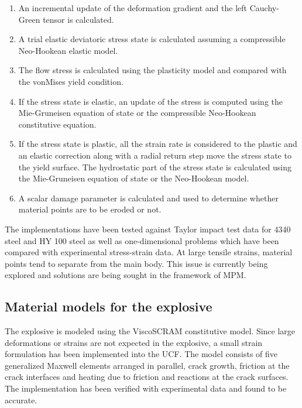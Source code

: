 \begin{itemize}
\begin{enumerate}
        \item An incremental update of the deformation gradient and
              the left Cauchy-Green tensor is calculated.
        \item A trial elastic deviatoric stress state is calculated
              assuming a compressible Neo-Hookean elastic model.
        \item The flow stress is calculated using the plasticity
              model and compared with the vonMises yield condition.
        \item If the stress state is elastic, an update of the 
              stress is computed using the Mie-Gruneisen equation
              of state or the compressible Neo-Hookean constitutive
              equation.
        \item If the stress state is plastic, all the strain rate 
              is considered to the plastic and an elastic correction
              along with a radial return step move the stress state
              to the yield surface.  The hydrostatic part of the 
              stress state is calculated using the Mie-Gruneisen
              equation of state or the Neo-Hookean model.
        \item A scalar damage parameter is calculated and used
              to determine whether material points are to be eroded
              or not.
     \end{enumerate}
\end{itemize}

The implementations have been tested against Taylor impact test data
for 4340 steel and HY 100 steel as well as one-dimensional problems
which have been compared with experimental stress-strain data.  At 
large tensile strains, material points tend to separate from the 
main body.  This issue is currently being explored and solutions are
being sought in the framework of MPM.

\subsection{Material models for the explosive}
The explosive is modeled using the ViscoSCRAM constitutive 
model.  Since large deformations or strains are not expected in 
the explosive, a small strain formulation has been implemented into 
the UCF.  The model consists of five generalized Maxwell elements
arranged in parallel, crack growth, friction at the crack 
interfaces and heating due to friction and reactions at the 
crack surfaces.  The implementation has been verified with 
experimental data and found to be accurate.

%


